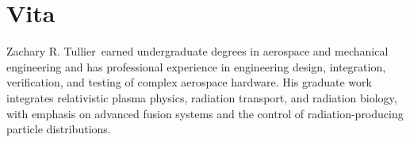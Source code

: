 \documentclass[12pt,oneside]{report}
\newcommand{\AuthorName}{Zachary R. Tullier}
\theoremstyle{definition}
\begin{document}
\begin{appendices}



\end{appendices}

\printbibliography[heading=bibintoc,title={References}]

\chapter*{Vita}
\AuthorName\ earned undergraduate degrees in aerospace and mechanical engineering and has professional experience in engineering design, integration, verification, and testing of complex aerospace hardware. His graduate work integrates relativistic plasma physics, radiation transport, and radiation biology, with emphasis on advanced fusion systems and the control of radiation-producing particle distributions.
\end{document}
